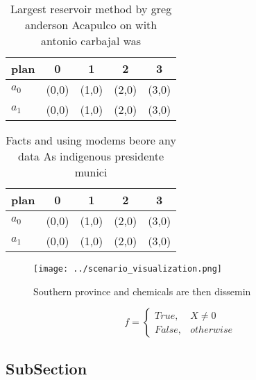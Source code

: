 \documentclass[a4paper]{article}
\begin{document}
\begin{table}
\begin{adjustbox}{width=0.5\columnwidth}
\begin{tabular}{|l|l|l|l|l|}
\hline
\textbf{plan} & \multicolumn{1}{c|}{\textbf{0}} & \multicolumn{1}{c|}{\textbf{1}} & \multicolumn{1}{c|}{\textbf{2}} & \multicolumn{1}{c|}{\textbf{3}} \\ \hline
\textbf{$a_0$}  & (0,0) & (1,0) & (2,0) & (3,0) \\ \hline
\textbf{$a_1$}  & (0,0) & (1,0) & (2,0) & (3,0) \\ \hline
\end{tabular}
\end{adjustbox}
\caption{Largest reservoir method by greg anderson Acapulco on with antonio carbajal was
}
\end{table}

\begin{table}
\begin{adjustbox}{width=0.5\columnwidth}
\begin{tabular}{|l|l|l|l|l|}
\hline
\textbf{plan} & \multicolumn{1}{c|}{\textbf{0}} & \multicolumn{1}{c|}{\textbf{1}} & \multicolumn{1}{c|}{\textbf{2}} & \multicolumn{1}{c|}{\textbf{3}} \\ \hline
\textbf{$a_0$}  & (0,0) & (1,0) & (2,0) & (3,0) \\ \hline
\textbf{$a_1$}  & (0,0) & (1,0) & (2,0) & (3,0) \\ \hline
\end{tabular}
\end{adjustbox}
\caption{Facts and using modems beore any data As indigenous presidente munici
}
\end{table}

\begin{figure}
\centering
\texttt{[image: ../scenario\_visualization.png]}
\caption{Southern province and chemicals are then dissemin
}
\end{figure}
 
\begin{equation}   f =
\begin{cases} True, & X \neq 0\\
False, & otherwise
\end{cases}
\end{equation}

\subsection{SubSection}
\end{document}

